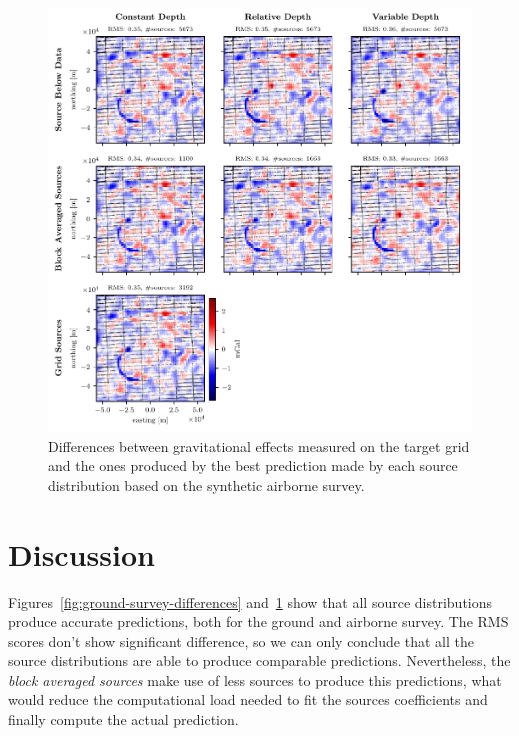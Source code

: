 \documentclass[twocolumn]{article}
\begin{document}
\begin{figure}
    \includegraphics[width=\linewidth]{figs/airborne_survey_differences.pdf}
    \caption{
        Differences between gravitational effects measured on the target grid
        and the ones produced by the best prediction made by each source
        distribution based on the synthetic airborne survey.
    }
    \label{fig:airborne-survey-differences}
\end{figure}




\section{Discussion}

Figures~\ref{fig:ground-survey-differences}
and~\ref{fig:airborne-survey-differences} show that all source distributions
produce accurate predictions, both for the ground and airborne survey.
The RMS scores don't show significant difference, so we can only conclude
that all the source distributions are able to produce comparable predictions.
Nevertheless, the \emph{block averaged sources} make use of less sources to
produce this predictions, what would reduce the computational load needed to
fit the sources coefficients and finally compute the actual prediction.
\end{document}
